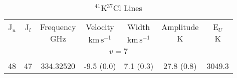 \begin{table*}[htp]
\centering
\caption{$^{41}$K$^{37}$Cl Lines}
\begin{tabular}{ccccccc}
\label{tab:41K37Cl_salt_lines}
 J$_u$ & J$_l$ & Frequency & Velocity & Width & Amplitude & E$_U$ \\
  &  & $\mathrm{GHz}$ & $\mathrm{km\,s^{-1}}$ & $\mathrm{km\,s^{-1}}$ & $\mathrm{K}$ & $\mathrm{K}$ \\
\hline
\hline
&\vspace{-0.75em}\\
\multicolumn{7}{c}{$v = 7$} \\
\vspace{-0.75em}\\
 48 & 47 & 334.32520 & -9.5 (0.0) & 7.1 (0.3) & 27.8 (0.8) & 3049.3 \\
\end{tabular}

\par 
\end{table*}
